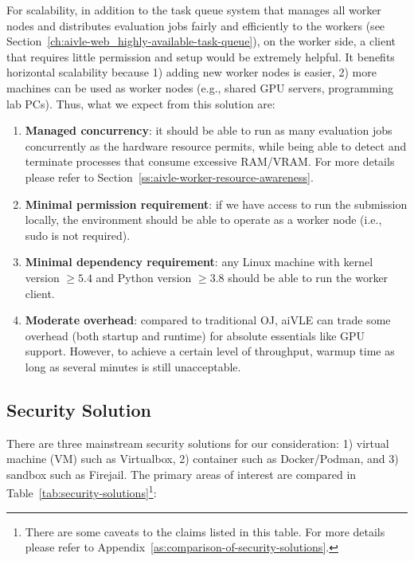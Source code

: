 For scalability, in addition to the task queue system that manages all worker nodes and distributes evaluation jobs fairly and efficiently to the workers (see Section~\ref{ch:aivle-web_highly-available-task-queue}), on the worker side, a client that requires little permission and setup would be extremely helpful. It benefits horizontal scalability because 1) adding new worker nodes is easier, 2) more machines can be used as worker nodes (e.g., shared GPU servers, programming lab PCs). Thus, what we expect from this solution are:
\begin{enumerate}
    \item \textbf{Managed concurrency}: it should be able to run as many evaluation jobs concurrently as the hardware resource permits, while being able to detect and terminate processes that consume excessive RAM/VRAM. For more details please refer to Section~\ref{ss:aivle-worker-resource-awareness}.
    \item \textbf{Minimal permission requirement}: if we have access to run the submission locally, the environment should be able to operate as a worker node (i.e., sudo is not required).
    \item \textbf{Minimal dependency requirement}: any Linux machine with kernel version $\ge 5.4$ and Python version $\ge 3.8$ should be able to run the worker client.
    \item \textbf{Moderate overhead}: compared to traditional OJ, aiVLE can trade some overhead (both startup and runtime) for absolute essentials like GPU support. However, to achieve a certain level of throughput, warmup time as long as several minutes is still unacceptable.
\end{enumerate}

\subsection{Security Solution}
There are three mainstream security solutions for our consideration: 1) virtual machine (VM) such as Virtualbox, 2) container such as Docker/Podman, and 3) sandbox such as Firejail. The primary areas of interest are compared in Table~\ref{tab:security-solutions}\footnote{There are some caveats to the claims listed in this table. For more details please refer to Appendix~\ref{as:comparison-of-security-solutions}.}:

